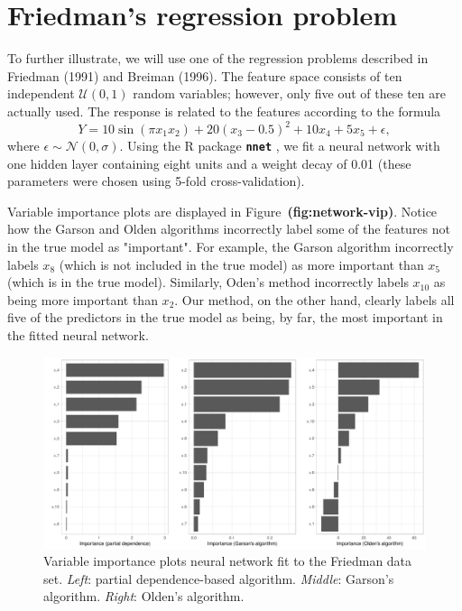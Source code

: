 \documentclass[12pt]{article}
\newcommand{\pkg}[1]{\texorpdfstring%
{{\normalfont\fontseries{b}\selectfont #1}}%
{#1}}
\def\pkg#1{\textbf{\texttt{#1}}}
\def\ref#1{\textbf{(#1)}}
\begin{document}
\section{Friedman's regression problem}

To further illustrate, we will use one of the regression problems described in Friedman (1991) and Breiman (1996). The feature space consists of ten independent $\mathcal{U}\left(0, 1\right)$ random variables; however, only five out of these ten are actually used. The response is related to the features according to the formula
\begin{equation*}
Y = 10 \sin\left(\pi x_1 x_2\right) + 20 \left(x_3 - 0.5\right) ^ 2 + 10 x_4 + 5 x_5 + \epsilon,
\end{equation*}
where $\epsilon \sim \mathcal{N}\left(0, \sigma\right)$. Using the R package \pkg{nnet} \citep{venables-modern-2002}, we fit a neural network with one hidden layer containing eight units and a weight decay of 0.01 (these parameters were chosen using 5-fold cross-validation).

Variable importance plots are displayed in Figure~\ref{fig:network-vip}. Notice how the Garson and Olden algorithms incorrectly label some of the features not in the true model as "important". For example, the Garson algorithm incorrectly labels $x_8$ (which is not included in the true model) as more important than $x_5$ (which is in the true model). Similarly, Oden's method incorrectly labels $x_10$ as being more important than $x_2$. Our method, on the other hand, clearly labels all five of the predictors in the true model as being, by far, the most important in the fitted neural network.

\begin{figure}[!htb]
  \centering
  \includegraphics[width=1.0\textwidth]{network-vip}
  \caption{Variable importance plots neural network fit to the Friedman data set. \textit{Left}: partial dependence-based algorithm. \textit{Middle}: Garson's algorithm. \textit{Right}: Olden's algorithm. \label{fig:network-vip}}
\end{figure}
\end{document}

